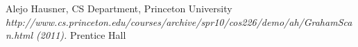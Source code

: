 \begin{thebibliography}{4}
 Alejo Hausner, CS Department, Princeton University
 \emph{http://www.cs.princeton.edu/courses/archive/spr10/cos226/demo/ah/GrahamScan.html (2011).} Prentice Hall
\end{thebibliography}

